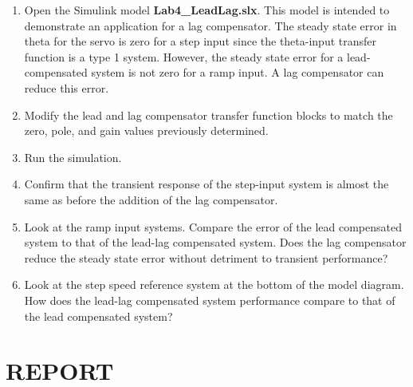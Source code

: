 \documentclass[11pt,a4paper]{article}
\begin{document}
\begin{enumerate}
\item Open the Simulink model \textbf{Lab4\_LeadLag.slx}. This model is intended to demonstrate an application for a lag compensator. The steady state error in theta for the servo is zero for a step input since the theta-input transfer function is a type 1 system. However, the steady state error for a lead-compensated system is not zero for a ramp input. A lag compensator can reduce this error. 

\item Modify the lead and lag compensator transfer function blocks to match the zero, pole, and gain values previously determined.

\item Run the simulation.

\item Confirm that the transient response of the step-input system is almost the same as before the addition of the lag compensator.

\item Look at the ramp input systems. Compare the error of the lead compensated system to that of the lead-lag compensated system. Does the lag compensator reduce the steady state error without detriment to transient performance?

\item Look at the step speed reference system at the bottom of the model diagram. How does the lead-lag compensated system performance compare to that of the lead compensated system?

\end{enumerate}



\section{REPORT}
\end{document}
